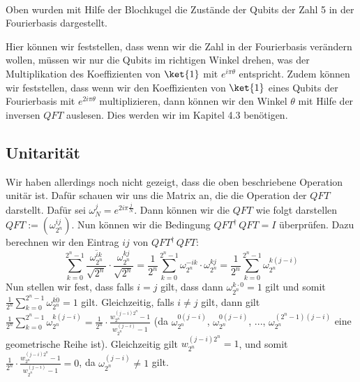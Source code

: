 \paragraph{}
Oben wurden mit Hilfe der Blochkugel die Zustände der Qubits der Zahl 5 in der Fourierbasis dargestellt.

\noindent Hier können wir feststellen, dass wenn wir die Zahl in der Fourierbasis verändern wollen, müssen wir nur die Qubits im richtigen Winkel drehen, was der Multiplikation des Koeffizienten von $\ket{1}$ mit $e^{i\pi\theta}$ entspricht. Zudem können wir feststellen, dass wenn wir den Koeffizienten von $\ket{1}$ eines Qubits der Fourierbasis mit $e^{2i\pi\theta}$ multiplizieren, dann können wir den Winkel $\theta$ mit Hilfe der inversen $QFT$ auslesen. Dies werden wir im Kapitel 4.3 benötigen.

\subsection{Unitarität}
Wir haben allerdings noch nicht gezeigt, dass die oben beschriebene Operation unitär ist. Dafür schauen wir uns die Matrix an, die die Operation der $QFT$ darstellt. Dafür sei $\omega_N^{j} = e^{2i\pi\frac{j}{N}}$. Dann können wir die $QFT$ wie folgt darstellen $QFT := (\omega_{2^n}^{ij})$. Nun können wir die Bedingung $QFT^{\dagger}\, QFT = I$ überprüfen. Dazu berechnen wir den Eintrag $ij$ von $QFT^{\dagger}\, QFT$:
$$\sum_{k = 0}^{2^n - 1}\frac{\overline{\omega_{2^n}^{ik}}}{\sqrt{2^n}} \cdot \frac{\omega_{2^n}^{kj}}{\sqrt{2^n}} = \frac{1}{2^n}\sum_{k = 0}^{2^n - 1}\omega_{2^n}^{-ik} \cdot \omega_{2^n}^{kj} = \frac{1}{2^n}\sum_{k = 0}^{2^n - 1}\omega_{2^n}^{k(j - i)}$$
Nun stellen wir fest, dass falls $i = j$ gilt, dass dann $\omega_{2^n}^{k\cdot 0} = 1$ gilt und somit $\frac{1}{2^n}\sum_{k = 0}^{2^n - 1}\omega_{2^n}^{k\dot 0} = 1$ gilt. Gleichzeitig, falls $i \not= j$ gilt, dann gilt $\frac{1}{2^n}\sum_{k = 0}^{2^n - 1}\omega_{2^n}^{k(j - i)} = \frac{1}{2^n} \cdot \frac{w_{2^n}^{(j - i)2^n} - 1}{w_{2^n}^{(j - i)} - 1}$ (da $\omega_{2^n}^{0(j - i)}$, $\omega_{2^n}^{0(j - i)}$, ..., $\omega_{2^n}^{(2^n - 1)(j - i)}$ eine geometrische Reihe ist). Gleichzeitig gilt $w_{2^n}^{(j - i)2^n} = 1$, und somit $\frac{1}{2^n} \cdot \frac{w_{2^n}^{(j - i)2^n} - 1}{w_{2^n}^{(j - i)} - 1} = 0$, da $\omega^{(j - i)}_{2^n} \not= 1$ gilt.

\paragraph{}


